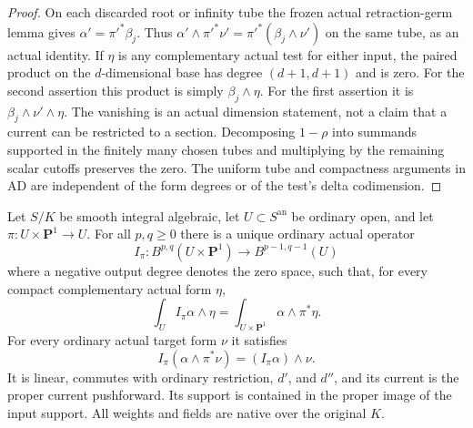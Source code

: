 \begin{proof}
On each discarded root or infinity tube the frozen actual
retraction-germ lemma gives $\alpha'=\pi'^*\beta_j$.  Thus
$\alpha'\wedge\pi'^*\nu'=\pi'^*(\beta_j\wedge\nu')$ on
the same tube, as an actual identity.  If $\eta$ is any
complementary actual test for either input, the paired product
on the $d$-dimensional base has degree $(d+1,d+1)$ and is zero.
For the second assertion this product is simply
$\beta_j\wedge\eta$.  For the first assertion it is
$\beta_j\wedge\nu'\wedge\eta$.
The vanishing is an actual dimension statement, not a claim that
a current can be restricted to a section.  Decomposing $1-\rho$
into summands supported in the finitely many chosen tubes and
multiplying by the remaining scalar cutoffs preserves the zero.
The uniform tube and compactness arguments in AD are independent
of the form degrees or of the test's delta codimension.
\end{proof}

\begin{theorem}
\label{r16out:line}
Let $S/K$ be smooth integral algebraic, let $U\subset S^{\mathrm{an}}$
be ordinary open, and let $\pi:U\times\mathbf P^1\to U$.  For all
$p,q\geq0$ there is a unique ordinary actual operator
\[
 I_\pi:B^{p,q}(U\times\mathbf P^1)\longrightarrow B^{p-1,q-1}(U)
 \tag{OUT16.3}\label{r16out:line-map}
\]
where a negative output degree denotes the zero space, such that,
for every compact complementary actual form $\eta$,
\[
 \int_U I_\pi\alpha\wedge\eta
       =\int_{U\times\mathbf P^1}\alpha\wedge\pi^*\eta.
 \tag{OUT16.4}\label{r16out:line-pairing}
\]
For every ordinary actual target form $\nu$ it satisfies
\[
 I_\pi(\alpha\wedge\pi^*\nu)=(I_\pi\alpha)\wedge\nu.
 \tag{OUT16.5}\label{r16out:line-projection}
\]
It is linear, commutes with ordinary restriction, $d'$, and $d''$,
and its current is the proper current pushforward.  Its support
is contained in the proper image of the input support.  All weights
and fields are native over the original $K$.
\end{theorem}

